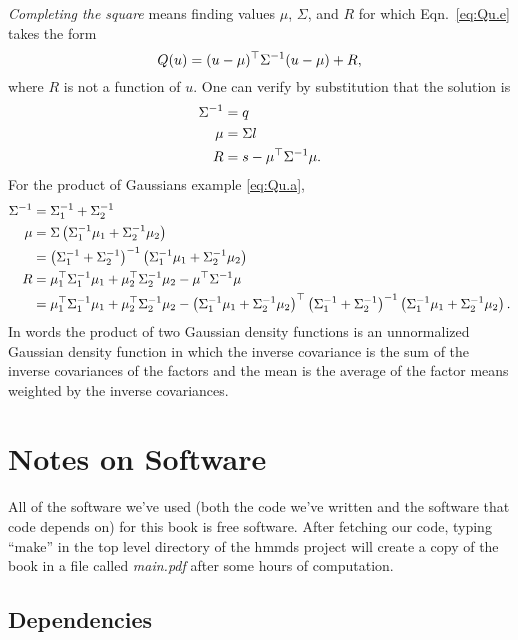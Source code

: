 \emph{Completing the square} means finding values $\mu$, $\Sigma$, and
$R$ for which Eqn.~\eqref{eq:Qu.e} takes the form
\begin{equation}
  \label{eq:Qu.f}
  Q(u) = (u - \mu)^\top \Sigma^{-1} (u - \mu) + R,
\end{equation}
where $R$ is not a function of $u$.  One can verify by substitution
that the solution is
\begin{align*}
  \Sigma^{-1} &= q\\
  \mu &= \Sigma l\\
  R &= s -  \mu^\top \Sigma^{-1} \mu.
\end{align*}
For the product of Gaussians example \eqref{eq:Qu.a},
\begin{align*}
  \Sigma^{-1} &= \Sigma_1^{-1} + \Sigma_2^{-1} \\
  \mu &= \Sigma \left( \Sigma_1^{-1} \mu_1 + \Sigma_2^{-1} \mu_2
  \right) \\
  &= \left( \Sigma_1^{-1} + \Sigma_2^{-1} \right)^{-1} \left(
  \Sigma_1^{-1} \mu_1 + \Sigma_2^{-1} \mu_2  \right) \\
  R &= \mu_1^\top \Sigma_1^{-1} \mu_1 + \mu_2^\top
  \Sigma_2^{-1} \mu_2 -  \mu^\top \Sigma^{-1} \mu \\
  &= \mu_1^\top \Sigma_1^{-1} \mu_1 + \mu_2^\top
  \Sigma_2^{-1} \mu_2 - \left( \Sigma_1^{-1} \mu_1 + \Sigma_2^{-1}
  \mu_2  \right) ^\top \left( \Sigma_1^{-1} + \Sigma_2^{-1}
  \right)^{-1} \left( \Sigma_1^{-1} \mu_1 + \Sigma_2^{-1} \mu_2
  \right).
\end{align*}
In words the product of two Gaussian density functions is an
unnormalized Gaussian density function in which the inverse covariance
is the sum of the inverse covariances of the factors and the mean is
the average of the factor means weighted by the inverse covariances.

\chapter{Notes on Software}
\label{cha:Software}

All of the software we've used (both the code we've written and the
software that code depends on) for this book is free software.  After
fetching our code, typing ``make'' in the top level directory of the
hmmds project will create a copy of the book in a file called
\emph{main.pdf} after some hours of computation.

\section{Dependencies}
\label{sec:SWdep}

